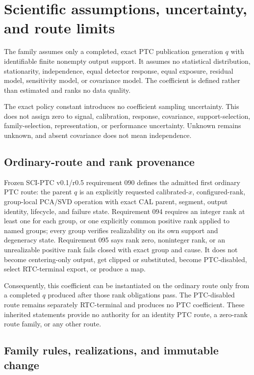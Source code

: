 \section{Scientific assumptions, uncertainty, and route limits}

The family assumes only a completed, exact PTC publication generation \(q\)
with identifiable finite nonempty output support. It assumes no statistical
distribution, stationarity, independence, equal detector response, equal
exposure, residual model, sensitivity model, or covariance model. The
coefficient is defined rather than estimated and ranks no data quality.

The exact policy constant introduces no coefficient sampling uncertainty.
This does not assign zero to signal, calibration, response, covariance,
support-selection, family-selection, representation, or performance
uncertainty. Unknown remains unknown, and absent covariance does not mean
independence.

\subsection{Ordinary-route and rank provenance}

Frozen SCI-PTC v0.1/r0.5 requirement 090 defines the admitted first ordinary
PTC route: the parent \(q\) is an explicitly requested calibrated-\(x\),
configured-rank, group-local PCA/SVD operation with exact CAL parent, segment,
output identity, lifecycle, and failure state. Requirement 094 requires an
integer rank at least one for each group, or one explicitly common positive
rank applied to named groups; every group verifies realizability on its own
support and degeneracy state. Requirement 095 says rank zero, noninteger rank,
or an unrealizable positive rank fails closed with exact group and cause. It
does not become centering-only output, get clipped or substituted, become
PTC-disabled, select RTC-terminal export, or produce a map.

Consequently, this coefficient can be instantiated on the ordinary route only
from a completed \(q\) produced after those rank obligations pass. The
PTC-disabled route remains separately RTC-terminal and produces no PTC
coefficient. These inherited statements provide no authority for an identity
PTC route, a zero-rank route family, or any other route.

\subsection{Family rules, realizations, and immutable change}

